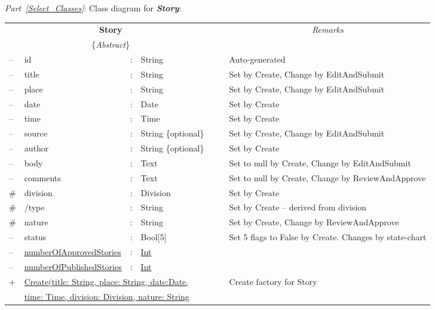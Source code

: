 \documentclass{article}
\begin{document}
\newpage
{\em Part~\ref{Select_Classes}}: Class diagram for {\bf \em Story}:

\begin{center}
\begin{scriptsize}
\begin{tabular}{|lllll|l|p{7cm}|} \cline{1-5} \cline{7-7}
\multicolumn{5}{|c|}{\bf Story} 			& & \multicolumn{1}{|c|}{\em Remarks}\\
\multicolumn{5}{|c|}{\{{\em Abstract}\} } 	& & \multicolumn{1}{|c|}{\em }\\ \cline{1-5} \cline{7-7}
-- & id 		& : & String 				& & & Auto-generated\\
-- & title 		& : & String 				& & & Set by Create, Change by EditAndSubmit \\
-- & place 		& : & String 				& & & Set by Create, Change by EditAndSubmit \\
-- & date 		& : & Date 					& & & Set by Create \\
-- & time 		& : & Time 					& & & Set by Create \\
-- & source 	& : & String \{optional\} 	& & & Set by Create, Change by EditAndSubmit \\
-- & author 	& : & String \{optional\} 	& & & Set by Create \\
-- & body 		& : & Text 					& & & Set to null by Create, Change by EditAndSubmit \\
-- & comments 	& : & Text 					& & & Set to null by Create, Change by ReviewAndApprove \\
\# & division 	& : & Division 				& & & Set by Create \\
\# & /type 		& : & String 				& & & Set by Create -- derived from division \\
\# & nature 	& : & String 				& & & Set by Create, Change by ReviewAndApprove \\
-- & status 	& : & Bool[5] 				& & & Set 5 flags to False by Create. Changes by state-chart  \\
-- & \underline{numberOfApprovedStories} & : & \underline{Int} & & &  \\
-- & \underline{numberOfPublishedStories} & : & \underline{Int} & & &  \\ \cline{1-5} \cline{7-7}
 + & \multicolumn{4}{l|}{\underline{Create(title: String, place: String, date:Date, }} & & Create factory for Story \\ 
   & \multicolumn{4}{l|}{\quad \quad \underline{time: Time, division: Division, nature: String}} & &  \\ 

\end{tabular}
\end{scriptsize}
\end{center}
\end{document}
